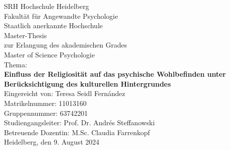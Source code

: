 \begin{titlepage}
\begin{center}

\thispagestyle{empty} 

    SRH Hochschule Heidelberg\\
    Fakultät für Angewandte Psychologie\\
    Staatlich anerkannte Hochschule\\[3cm]
    
    Master-Thesis\\   
    zur Erlangung des akademischen Grades\\
    Master of Science Psychologie\\[1.5cm]

    Thema:\\
    {\bf Einfluss der Religiosität auf das psychische Wohlbefinden unter Berücksichtigung des kulturellen Hintergrundes} \\[2cm]  

    Eingereicht von: Teresa Seidl Fern\'andez\\    %
    Matrikelnummer: 11013160\\                     %
    Gruppennummer: 63742201\\[2.5cm]               %

    Studiengangsleiter: Prof. Dr. Andrés Steffanowski\\
    Betreuende Dozentin: M.Sc. Claudia Farrenkopf\\[1cm]       %

    Heidelberg, den 9. August 2024 %

\end{center}
\end{titlepage}